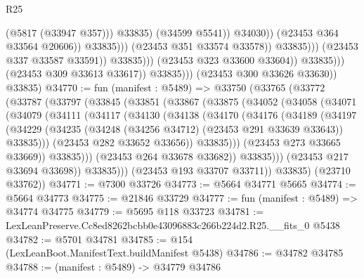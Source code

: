 \begin{lexlean}{R25}
\begin{coremodule}
                                                          (@5817 (@33947 @357)))
                                                        @33835)
                                                      (@34599 @5541))
                                                    @34030))
                                                (@23453 @364 @33564 @20606))
                                              @33835)))
                                        (@23453 @351 @33574 @33578))
                                      @33835)))
                                (@23453 @337 @33587 @33591))
                              @33835)))
                        (@23453 @323 @33600 @33604))
                      @33835)))
                (@23453 @309 @33613 @33617))
              @33835)))
        (@23453 @300 @33626 @33630))
      @33835)
@34770 := fun (manifest : @5489) =>
  @33750
    (@33765
      (@33772
        (@33787
          (@33797
            (@33845
              (@33851
                (@33867
                  (@33875
                    (@34052
                      (@34058
                        (@34071
                          (@34079
                            (@34111
                              (@34117
                                (@34130
                                  (@34138
                                    (@34170
                                      (@34176
                                        (@34189
                                          (@34197
                                            (@34229
                                              (@34235
                                                (@34248 (@34256 @34712) (@23453 @291 @33639 @33643))
                                                @33835)))
                                          (@23453 @282 @33652 @33656))
                                        @33835)))
                                  (@23453 @273 @33665 @33669))
                                @33835)))
                          (@23453 @264 @33678 @33682))
                        @33835)))
                  (@23453 @217 @33694 @33698))
                @33835)))
          (@23453 @193 @33707 @33711))
        @33835)
      (@23710 @33762))
@34771 := @7300 @33726
@34773 := @5664 @34771 @5665
@34774 := @5664 @34773
@34775 := @21846 @33729
@34777 := fun (manifest : @5489) => @34774 @34775
@34779 := @5695 @118 @33723
@34781 := LexLeanPreserve.Cc8ed8262bcbb0e43096883c266b224d2.R25.__fits_0 @5438
@34782 := @5701 @34781
@34785 := @154 (LexLeanBoot.ManifestText.buildManifest @5438)
@34786 := @34782 @34785
@34788 := (manifest : @5489) -> @34779 @34786

\end{coremodule}
\end{lexlean}

